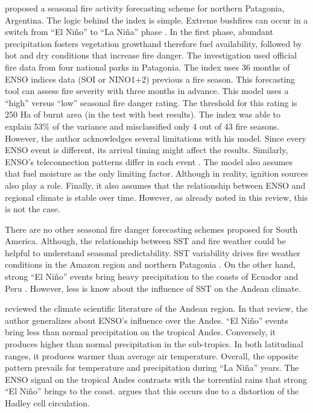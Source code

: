 \citet{Kitzberger2002} proposed a seasonal fire activity forecasting
scheme for northern Patagonia, Argentina. The logic behind the index
is simple. Extreme bushfires can occur in a switch from \textquotedblleft El
Ni\~no\textquotedblright{} to \textquotedblleft La Ni\~na\textquotedblright{}
phase \citep{Baisan1990,Swetnam1990,Kitzberger1997,Veblen1999}. In
the first phase, abundant precipitation fosters vegetation growth\textemdash and
therefore fuel availability\textemdash , followed by hot and dry conditions
that increase fire danger. The investigation used official fire data
from four national parks in Patagonia. The index uses 36 months of
ENSO indices data (SOI or NINO1+2) previous a fire season. This forecasting
tool can assess fire severity with three months in advance. This model
uses a \textquotedblleft high\textquotedblright{} versus \textquotedblleft low\textquotedblright{}
seasonal fire danger rating. The threshold for this rating is 250
Ha of burnt area (in the test with best results). The index was able
to explain 53\% of the variance and misclassified only 4 out of 43
fire seasons. However, the author acknowledges several limitations
with his model. Since every ENSO event is different, its arrival timing
might affect the results. Similarly, ENSO's teleconnection patterns
differ in each event \citep{Villalba1994}. The model also assumes
that fuel moisture as the only limiting factor. Although in reality,
ignition sources also play a role. Finally, it also assumes that the
relationship between ENSO and regional climate is stable over time.
However, as already noted in this review, this is not the case. 

There are no other seasonal fire danger forecasting schemes proposed
for South America. Although, the relationship between SST and fire
weather could be helpful to understand seasonal predictability. SST variability drives fire weather conditions in the Amazon region
and northern Patagonia \citep{Kousky1984,Ropelewski1987,Fernandes2011,Kitzberger2001,Kitzberger2002}.
On the other hand, strong \textquotedblleft El Ni\~no\textquotedblright{}
events bring heavy precipitation to the coasts of Ecuador and Peru
\citep{Rasmusson1982,Horel1986,Rodbell1999}. However, less is know
about the influence of SST on the Andean climate. 

\citet{Garreaud2009} reviewed the climate scientific literature of
the Andean region. In that review, the author generalizes about ENSO's
influence over the Andes. \textquotedblleft El Ni\~no\textquotedblright{}
events bring less than normal precipitation on the tropical Andes.
Conversely, it produces higher than normal precipitation in the sub-tropics.
In both latitudinal ranges, it produces warmer than average air temperature.
Overall, the opposite pattern prevails for temperature and precipitation
during \textquotedblleft La Ni\~na\textquotedblright{} years. The ENSO
signal on the tropical Andes contrasts with the torrential rains that
strong \textquotedblleft El Ni\~no\textquotedblright{} brings to the
coast. \citet{Garreaud2009} argues that this occurs due
to a distortion of the Hadley cell circulation. 

